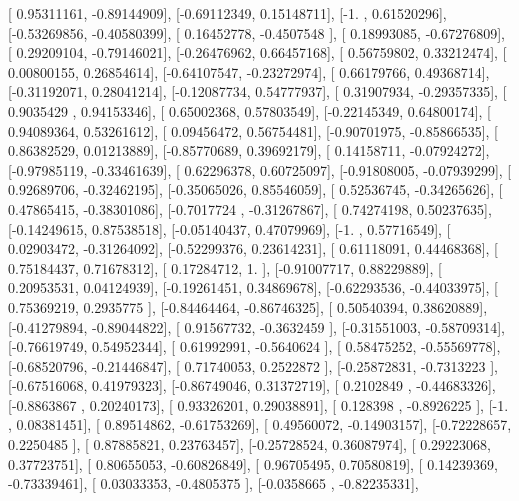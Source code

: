 \documentclass{article}
\begin{document}
       [ 0.95311161, -0.89144909],
       [-0.69112349,  0.15148711],
       [-1.        ,  0.61520296],
       [-0.53269856, -0.40580399],
       [ 0.16452778, -0.4507548 ],
       [ 0.18993085, -0.67276809],
       [ 0.29209104, -0.79146021],
       [-0.26476962,  0.66457168],
       [ 0.56759802,  0.33212474],
       [ 0.00800155,  0.26854614],
       [-0.64107547, -0.23272974],
       [ 0.66179766,  0.49368714],
       [-0.31192071,  0.28041214],
       [-0.12087734,  0.54777937],
       [ 0.31907934, -0.29357335],
       [ 0.9035429 ,  0.94153346],
       [ 0.65002368,  0.57803549],
       [-0.22145349,  0.64800174],
       [ 0.94089364,  0.53261612],
       [ 0.09456472,  0.56754481],
       [-0.90701975, -0.85866535],
       [ 0.86382529,  0.01213889],
       [-0.85770689,  0.39692179],
       [ 0.14158711, -0.07924272],
       [-0.97985119, -0.33461639],
       [ 0.62296378,  0.60725097],
       [-0.91808005, -0.07939299],
       [ 0.92689706, -0.32462195],
       [-0.35065026,  0.85546059],
       [ 0.52536745, -0.34265626],
       [ 0.47865415, -0.38301086],
       [-0.7017724 , -0.31267867],
       [ 0.74274198,  0.50237635],
       [-0.14249615,  0.87538518],
       [-0.05140437,  0.47079969],
       [-1.        ,  0.57716549],
       [ 0.02903472, -0.31264092],
       [-0.52299376,  0.23614231],
       [ 0.61118091,  0.44468368],
       [ 0.75184437,  0.71678312],
       [ 0.17284712,  1.        ],
       [-0.91007717,  0.88229889],
       [ 0.20953531,  0.04124939],
       [-0.19261451,  0.34869678],
       [-0.62293536, -0.44033975],
       [ 0.75369219,  0.2935775 ],
       [-0.84464464, -0.86746325],
       [ 0.50540394,  0.38620889],
       [-0.41279894, -0.89044822],
       [ 0.91567732, -0.3632459 ],
       [-0.31551003, -0.58709314],
       [-0.76619749,  0.54952344],
       [ 0.61992991, -0.5640624 ],
       [ 0.58475252, -0.55569778],
       [-0.68520796, -0.21446847],
       [ 0.71740053,  0.2522872 ],
       [-0.25872831, -0.7313223 ],
       [-0.67516068,  0.41979323],
       [-0.86749046,  0.31372719],
       [ 0.2102849 , -0.44683326],
       [-0.8863867 ,  0.20240173],
       [ 0.93326201,  0.29038891],
       [ 0.128398  , -0.8926225 ],
       [-1.        ,  0.08381451],
       [ 0.89514862, -0.61753269],
       [ 0.49560072, -0.14903157],
       [-0.72228657,  0.2250485 ],
       [ 0.87885821,  0.23763457],
       [-0.25728524,  0.36087974],
       [ 0.29223068,  0.37723751],
       [ 0.80655053, -0.60826849],
       [ 0.96705495,  0.70580819],
       [ 0.14239369, -0.73339461],
       [ 0.03033353, -0.4805375 ],
       [-0.0358665 , -0.82235331],
\end{document}
